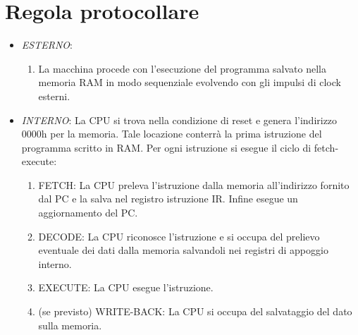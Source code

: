 \section{Regola protocollare}
\begin{itemize}
	\item \textit{ESTERNO}:
	\begin{enumerate}
		\item La macchina procede con l'esecuzione del programma salvato nella memoria RAM in modo sequenziale evolvendo con gli impulsi di clock esterni.
	\end{enumerate}

	\item \textit{INTERNO}:
	La CPU si trova nella condizione di reset e genera l'indirizzo 0000h per la memoria. Tale locazione conterrà la prima istruzione del programma scritto in RAM. Per ogni istruzione si esegue il ciclo di fetch-execute:
	\begin{enumerate}
		\item FETCH: La CPU preleva l'istruzione dalla memoria all'indirizzo fornito dal PC e la salva nel registro istruzione IR. Infine esegue un aggiornamento del PC.
		\item DECODE: La CPU riconosce l'istruzione e si occupa del prelievo eventuale dei dati dalla memoria salvandoli nei registri di appoggio interno.
		\item EXECUTE: La CPU esegue l'istruzione.
		\item (se previsto) WRITE-BACK: La CPU si occupa del salvataggio del dato sulla memoria.
	\end{enumerate}
\end{itemize}

